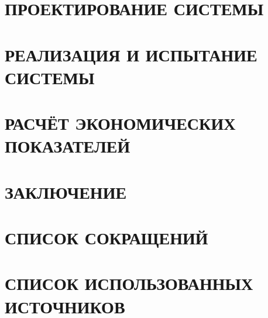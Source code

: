 \newpage
\section{ПРОЕКТИРОВАНИЕ СИСТЕМЫ}






\newpage
\section{РЕАЛИЗАЦИЯ И ИСПЫТАНИЕ СИСТЕМЫ}



\newpage
\section{РАСЧЁТ ЭКОНОМИЧЕСКИХ ПОКАЗАТЕЛЕЙ}


\newpage
{}
{}
\section*{ЗАКЛЮЧЕНИЕ}


\newpage
{}
{}
\section*{СПИСОК СОКРАЩЕНИЙ}


\newpage
{}
{}
\section*{СПИСОК ИСПОЛЬЗОВАННЫХ ИСТОЧНИКОВ}



